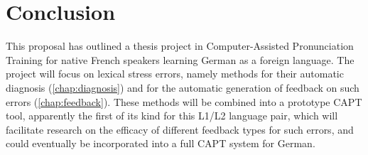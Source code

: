 \documentclass[11pt]{article} %
\let\oldsection\section
\let\oldsubsec\subsection
\let\oldsubsubsec\subsubsection
\let\oldparagraph\paragraph
\let\section\subsection
\let\subsection\subsubsection
\begin{document}



\let\section\oldsection
\let\subsection\oldsubsec
\let\subsubsection\oldsubsubsec
\let\paragraph\oldparagraph


\section{Conclusion}
\label{sec:conclusion}

This proposal has outlined a thesis project in Computer-Assisted Pronunciation Training for native French speakers learning German as a foreign language. The project will focus on lexical stress errors, namely methods for their automatic diagnosis (\cref{chap:diagnosis}) and for the automatic generation of feedback on such errors (\cref{chap:feedback}). These methods will be combined into a prototype CAPT tool, apparently the first of its kind for this L1/L2 language pair, which will facilitate research on the efficacy of different feedback types for such errors, and could eventually be incorporated into a full CAPT system for German.

\clearpage
\printbibliography
\end{document}
